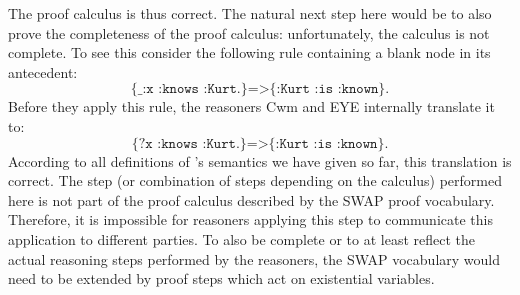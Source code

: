 The proof calculus is thus correct. %
The natural next step here would be to also prove the completeness of the proof calculus: unfortunately, the calculus is not complete.
% 
To see this consider the following rule containing a blank node in its antecedent:
\[
 \texttt{\{\_:x :knows :Kurt.\}=>\{:Kurt :is :known\}.}
\]
Before they apply this rule, the reasoners Cwm and EYE internally translate it to:
\[
 \texttt{\{?x :knows :Kurt.\}=>\{:Kurt :is :known\}.}
\]
According to all definitions of \nthree's semantics we have given so far, this translation is correct. The step (or combination of steps depending on the calculus) 
performed here is not part of the proof calculus described by the SWAP
proof vocabulary. Therefore, it is impossible for reasoners applying this step to communicate this application to different parties. To also be complete or to at least reflect the actual 
reasoning steps performed by the reasoners, the SWAP vocabulary would need to be extended by proof steps which act on existential variables.

